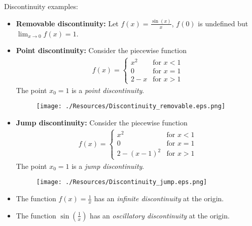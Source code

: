 \documentclass[12pt, a4paper]{article}
\begin{document}
\begin{example}
    Discontinuity examples:
    \begin{itemize}
        \item \textbf{Removable discontinuity:} Let \(f(x) =\frac{\sin(x)}{x}\), \(f(0)\) is undefined but \(\lim_{x\to 0} f(x)=1\).
        \item \textbf{Point discontinuity:} Consider the piecewise function 
        \[\begin{aligned}
            f(x) = \begin{cases}
                x^2 &\text{for } x<1 \\
                0 &\text{for } x=1 \\
                2-x &\text{for } x>1
            \end{cases}
        \end{aligned}\]
        The point \(x_0 =1\) is a \textit{point discontinuity}.
        \begin{figure}[H]
            \begin{center}
                \texttt{[image: ./Resources/Discontinuity\_removable.eps.png]}
            \end{center}
        \end{figure}
        \item \textbf{Jump discontinuity:}
        Consider the piecewise function 
        \[\begin{aligned}
            f(x) = \begin{cases}
                x^2 &\text{for } x<1 \\
                0 &\text{for } x=1 \\
                2-(x-1)^2 &\text{for } x>1
            \end{cases}
        \end{aligned}\]
        The point \(x_0 =1\) is a \textit{jump discontinuity}.
        \begin{figure}[H]
            \begin{center}
                \texttt{[image: ./Resources/Discontinuity\_jump.eps.png]}
            \end{center}
        \end{figure}
        \item The function \(f(x)=\frac{1}{x}\) has an \textit{infinite discontinuity} at the origin.
        \item The function \(\sin\left( \frac{1}{x} \right)\) has an \textit{oscillatory discontinuity} at the origin.
    \end{itemize}
\end{example}
\end{document}
